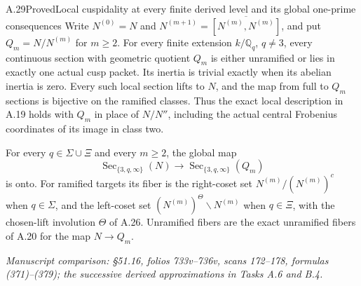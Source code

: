 \begin{statement}{A.29}{Proved}{Local cuspidality at every finite derived level and its global one-prime consequences}
Write $N^{(0)}=N$ and
$N^{(m+1)}=\overline{[N^{(m)},N^{(m)}]}$,
and put $Q_m=N/N^{(m)}$ for $m\ge2$.
For every finite extension $k/\mathbb Q_q$,
$q\ne3$, every continuous section with
geometric quotient $Q_m$ is either unramified
or lies in exactly one actual cusp packet.
Its inertia is trivial exactly when its
abelian inertia is zero. Every such local
section lifts to $N$, and the map from full
to $Q_m$ sections is bijective on the
ramified classes. Thus the exact local
description in A.19 holds with $Q_m$ in
place of $N/N''$, including the actual
central Frobenius coordinates of its image
in class two.

For every $q\in\Sigma\cup\Xi$ and every
$m\ge2$, the global map
\[
 \operatorname{Sec}_{\{3,q,\infty\}}(N)
       \longrightarrow
 \operatorname{Sec}_{\{3,q,\infty\}}(Q_m)
 \tag{A.29.1}
\]
is onto. For ramified targets its fiber
is the right-coset set
$N^{(m)}/(N^{(m)})^c$ when $q\in\Sigma$,
and the left-coset set
$(N^{(m)})^\Theta\backslash N^{(m)}$
when $q\in\Xi$, with the chosen-lift
involution $\Theta$ of A.26. Unramified
fibers are the exact unramified fibers
of A.20 for the map $N\to Q_m$.
\par\smallskip\noindent\emph{Manuscript comparison: \S51.16,
folios 733v--736v, scans 172--178, formulas (371)--(379);
the successive derived approximations in Tasks A.6 and B.4.}
\end{statement}
